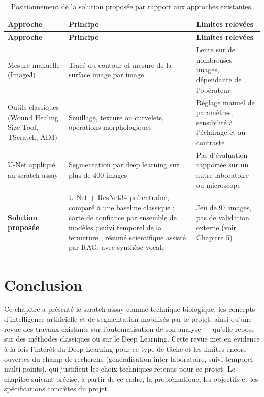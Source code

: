 \documentclass[12pt,a4paper]{report}
\begin{document}
\begin{small}
\begin{longtable}{L{3.4cm} L{5.4cm} L{5.2cm}}
\caption{Positionnement de la solution proposée par rapport aux approches existantes.}
\label{tab:solution_proposee} \\
\toprule
\textbf{Approche} & \textbf{Principe} & \textbf{Limites relevées} \\
\midrule
\endfirsthead
\toprule
\textbf{Approche} & \textbf{Principe} & \textbf{Limites relevées} \\
\midrule
\endhead
Mesure manuelle (ImageJ) & Tracé du contour et mesure de la surface image par image & Lente sur de nombreuses images, dépendante de l'opérateur \\
Outils classiques (Wound Healing Size Tool, TScratch, AIM) \cite{ref15,ref17} & Seuillage, texture ou curvelets, opérations morphologiques & Réglage manuel de paramètres, sensibilité à l'éclairage et au contraste \\
U-Net appliqué au scratch assay \cite{ref2} & Segmentation par deep learning sur plus de 400 images & Pas d'évaluation rapportée sur un autre laboratoire ou microscope \\
\textbf{Solution proposée} & U-Net + ResNet34 pré-entraîné, comparé à une baseline classique ; carte de confiance par ensemble de modèles ; suivi temporel de la fermeture ; résumé scientifique assisté par RAG, avec synthèse vocale & Jeu de 97 images, pas de validation externe (voir Chapitre 5) \\
\bottomrule
\end{longtable}
\end{small}

\section{Conclusion}

Ce chapitre a présenté le scratch assay comme technique biologique, les concepts d'intelligence artificielle et de segmentation mobilisés par le projet, ainsi qu'une revue des travaux existants sur l'automatisation de son analyse — qu'elle repose sur des méthodes classiques ou sur le Deep Learning. Cette revue met en évidence à la fois l'intérêt du Deep Learning pour ce type de tâche et les limites encore ouvertes du champ de recherche (généralisation inter-laboratoire, suivi temporel multi-points), qui justifient les choix techniques retenus pour ce projet. Le chapitre suivant précise, à partir de ce cadre, la problématique, les objectifs et les spécifications concrètes du projet.
\end{document}
